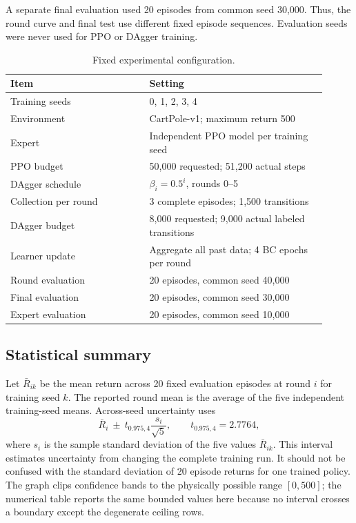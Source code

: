 \documentclass[11pt]{article}
\begin{document}
A separate final evaluation used 20 episodes from common seed 30,000. Thus, the round curve and final test use different fixed episode sequences. Evaluation seeds were never used for PPO or DAgger training.

\begin{table}[ht]
\centering
\caption{Fixed experimental configuration.}
\small
\begin{tabular}{@{}p{0.40\linewidth}p{0.51\linewidth}@{}}
\toprule
Item & Setting \\
\midrule
Training seeds & 0, 1, 2, 3, 4 \\
Environment & CartPole-v1; maximum return 500 \\
Expert & Independent PPO model per training seed \\
PPO budget & 50,000 requested; 51,200 actual steps \\
DAgger schedule & $\beta_i=0.5^i$, rounds 0--5 \\
Collection per round & 3 complete episodes; 1,500 transitions \\
DAgger budget & 8,000 requested; 9,000 actual labeled transitions \\
Learner update & Aggregate all past data; 4 BC epochs per round \\
Round evaluation & 20 episodes, common seed 40,000 \\
Final evaluation & 20 episodes, common seed 30,000 \\
Expert evaluation & 20 episodes, common seed 10,000 \\
\bottomrule
\end{tabular}
\end{table}

\subsection{Statistical summary}

Let $\bar R_{ik}$ be the mean return across 20 fixed evaluation episodes at round $i$ for training seed $k$. The reported round mean is the average of the five independent training-seed means. Across-seed uncertainty uses
\[
\bar R_i \ \pm\ t_{0.975,4}\frac{s_i}{\sqrt{5}},
\qquad t_{0.975,4}=2.7764,
\]
where $s_i$ is the sample standard deviation of the five values $\bar R_{ik}$. This interval estimates uncertainty from changing the complete training run. It should not be confused with the standard deviation of 20 episode returns for one trained policy. The graph clips confidence bands to the physically possible range $[0,500]$; the numerical table reports the same bounded values here because no interval crosses a boundary except the degenerate ceiling rows.
\end{document}
